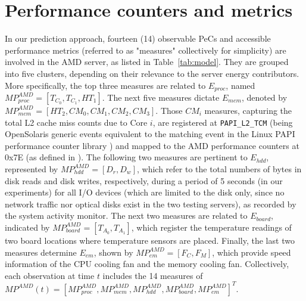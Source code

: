 \section{Performance counters and metrics}
\label{sec:variables}
In our prediction approach, fourteen (14) observable PeCs and accessible
performance metrics (referred to as "measures" collectively for simplicity)
are involved in the AMD server, as listed in Table~\ref{tab:model}.
They are grouped into five clusters, depending on their relevance to the
server energy contributors.  More specifically, the top three measures
are related to $E_{proc}$, named $MP_{proc}^{AMD} = \left[T_{C_{0}},
  T_{C_{1}}, HT_{1}\right]$.  The next five measures dictate $E_{mem}$,
denoted by $MP_{mem}^{AMD} = \left[HT_{2}, CM_{0}, CM_{1}, CM_{2},
  CM_{3}\right]$.  Those $CM_i$ measures, capturing the total L2 cache
miss counts due to Core $i$, are registered at \texttt{PAPI\_L2\_TCM} (being
OpenSolaris generic events equivalent to the matching event in the Linux
PAPI performance counter library \cite{London2001}) and mapped to the
AMD performance counters at 0x7E (as defined in \cite{AMD2008}).  The
following two measures are pertinent to $E_{hdd}$, represented by
$MP_{hdd}^{AMD} = \left[D_{r}, D_{w}\right]$, which refer to the total
numbers of bytes in disk reads and disk writes, respectively, during a
period of 5 seconds (in our experiments) for all I/O devices (which are
limited to the disk only, since no network traffic nor optical disks
exist in the two testing servers), as recorded by the system activity
monitor.  The next two measures are related to $E_{board}$, indicated by
$MP_{board}^{AMD} = \left[T_{A_0}, T_{A_1}\right]$, which register the
temperature readings of two board locations where temperature sensors
are placed.  Finally, the last two measures determine $E_{em}$, shown by
$MP_{em}^{AMD} = \left[F_C, F_M\right]$, which provide speed information
of the CPU cooling fan and the memory cooling fan.  Collectively, each
observation at time $t$ includes the 14 measures of $MP^{AMD}(t) =
\left[MP_{proc}^{AMD}, MP_{mem}^{AMD}, MP_{hdd}^{AMD},
  MP_{board}^{AMD},MP_{em}^{AMD}\right]^{T}$.
